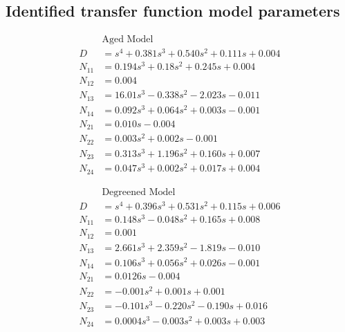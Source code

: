 \subsection*{Identified transfer function model parameters}
\begin{minipage}{0.49\textwidth}
\small
\begin{align*}
    &\text{Aged Model}\\
    D &= s^4 + 0.381 s^3 + 0.540 s^2 + 0.111 s + 0.004\\
    N_{11} &= 0.194 s^3 + 0.18 s^2 + 0.245 s + 0.004\\
    N_{12} &= 0.004\\
    N_{13} &= 16.01 s^3 - 0.338 s^2 - 2.023 s  - 0.011\\
    N_{14} &= 0.092 s^3 + 0.064 s^2 + 0.003 s - 0.001\\
    N_{21} &=  0.010 s - 0.004\\
    N_{22} &= 0.003 s^2 + 0.002 s - 0.001\\
    N_{23} &= 0.313 s^3 + 1.196 s^2 + 0.160 s + 0.007\\
    N_{24} &= 0.047 s^3 + 0.002 s^2 + 0.017 s + 0.004
\end{align*}
\end{minipage}
\begin{minipage}{0.49\textwidth}
\begin{align*}
    &\text{Degreened Model}\\
    D &= s^4 + 0.396 s^3 + 0.531 s^2 + 0.115 s + 0.006\\
    N_{11} &= 0.148 s^3 - 0.048 s^2 + 0.165 s + 0.008\\
    N_{12} &= 0.001\\
    N_{13} &= 2.661 s^3 + 2.359 s^2 - 1.819 s - 0.010\\
    N_{14} &= 0.106 s^3 + 0.056 s^2 + 0.026 s - 0.001\\
    N_{21} &= 0.0126 s - 0.004\\
    N_{22} &= -0.001 s^2 + 0.001 s + 0.001\\
    N_{23} &= -0.101 s^3 - 0.220 s^2 - 0.190 s  + 0.016\\
    N_{24} &= 0.0004 s^3 - 0.003 s^2 + 0.003 s + 0.003
\end{align*}
\end{minipage}
